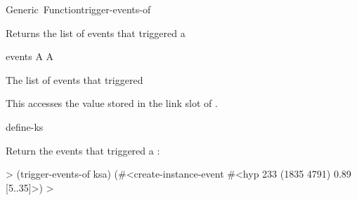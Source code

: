 \documentclass[10pt,twoside,english,pdftex]{article}
\begin{document}
\begin{functiondoc}{Generic~Function}{trigger-events-of}{ 
    }
%
%

\fnsyntax

\fnpurpose Returns the list of events that triggered a 

\fnmethods
{}

\fnpackage {}

\fnmodule {}

\fnargs
\begin{args}{events}
\arg[ksa] A 
\arg[events] A 
\end{args}

\fnreturns The list of events that triggered 
  
\fndescription 
This  accesses the value stored in the
 link slot of .

\begin{alsos}{define-ks}
\also[define-ks]
\also[ks]
\also[ksa]
\end{alsos}

\fnexample
%
Return the events that triggered a :
%
\W\supp
\begin{example}
  > (trigger-events-of ksa)
  (#<create-instance-event #<hyp 233 (1835 4791) 0.89 [5..35]>)
  >
\end{example}

\end{functiondoc}

\end{document}
